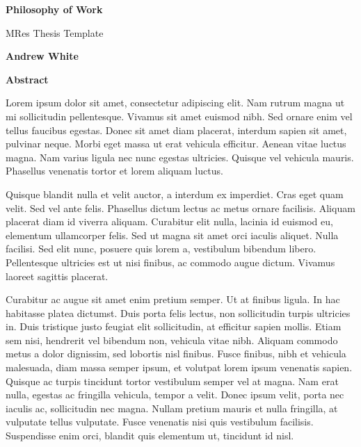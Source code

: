 
\thispagestyle{plain} %
\begin{center} %
    \Large 
    \textbf{Philosophy of Work}
 
    \vspace{0.5cm} %
    \large
    MRes Thesis Template
 
    \vspace{0.5cm} %
    \textbf{Andrew White}
 
    \vspace{0.9cm}
    \textbf{Abstract}
\end{center}
Lorem ipsum dolor sit amet, consectetur adipiscing elit. Nam rutrum magna ut mi sollicitudin pellentesque. Vivamus sit amet euismod nibh. Sed ornare enim vel tellus faucibus egestas. Donec sit amet diam placerat, interdum sapien sit amet, pulvinar neque. Morbi eget massa ut erat vehicula efficitur. Aenean vitae luctus magna. Nam varius ligula nec nunc egestas ultricies. Quisque vel vehicula mauris. Phasellus venenatis tortor et lorem aliquam luctus.

Quisque blandit nulla et velit auctor, a interdum ex imperdiet. Cras eget quam velit. Sed vel ante felis. Phasellus dictum lectus ac metus ornare facilisis. Aliquam placerat diam id viverra aliquam. Curabitur elit nulla, lacinia id euismod eu, elementum ullamcorper felis. Sed ut magna sit amet orci iaculis aliquet. Nulla facilisi. Sed elit nunc, posuere quis lorem a, vestibulum bibendum libero. Pellentesque ultricies est ut nisi finibus, ac commodo augue dictum. Vivamus laoreet sagittis placerat.

Curabitur ac augue sit amet enim pretium semper. Ut at finibus ligula. In hac habitasse platea dictumst. Duis porta felis lectus, non sollicitudin turpis ultricies in. Duis tristique justo feugiat elit sollicitudin, at efficitur sapien mollis. Etiam sem nisi, hendrerit vel bibendum non, vehicula vitae nibh. Aliquam commodo metus a dolor dignissim, sed lobortis nisl finibus. Fusce finibus, nibh et vehicula malesuada, diam massa semper ipsum, et volutpat lorem ipsum venenatis sapien. Quisque ac turpis tincidunt tortor vestibulum semper vel at magna. Nam erat nulla, egestas ac fringilla vehicula, tempor a velit. Donec ipsum velit, porta nec iaculis ac, sollicitudin nec magna. Nullam pretium mauris et nulla fringilla, at vulputate tellus vulputate. Fusce venenatis nisi quis vestibulum facilisis. Suspendisse enim orci, blandit quis elementum ut, tincidunt id nisl.
